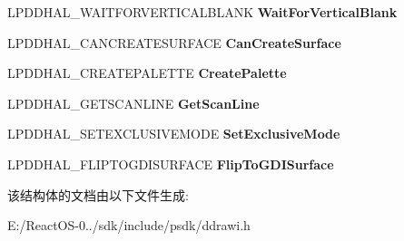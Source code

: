 \begin{DoxyCompactItemize}
L\+P\+D\+D\+H\+A\+L\+\_\+\+W\+A\+I\+T\+F\+O\+R\+V\+E\+R\+T\+I\+C\+A\+L\+B\+L\+A\+NK {\bfseries Wait\+For\+Vertical\+Blank}
\item 
\mbox{\label{struct___d_d_h_a_l___d_d_c_a_l_l_b_a_c_k_s_ae6a6874c5327c3bf841d5f1f0d74f0d4}} 
L\+P\+D\+D\+H\+A\+L\+\_\+\+C\+A\+N\+C\+R\+E\+A\+T\+E\+S\+U\+R\+F\+A\+CE {\bfseries Can\+Create\+Surface}
\item 
\mbox{\label{struct___d_d_h_a_l___d_d_c_a_l_l_b_a_c_k_s_a82879f935e596501893b5fc806541987}} 
L\+P\+D\+D\+H\+A\+L\+\_\+\+C\+R\+E\+A\+T\+E\+P\+A\+L\+E\+T\+TE {\bfseries Create\+Palette}
\item 
\mbox{\label{struct___d_d_h_a_l___d_d_c_a_l_l_b_a_c_k_s_a7786aa93923ee0b37fb30b10cedf978b}} 
L\+P\+D\+D\+H\+A\+L\+\_\+\+G\+E\+T\+S\+C\+A\+N\+L\+I\+NE {\bfseries Get\+Scan\+Line}
\item 
\mbox{\label{struct___d_d_h_a_l___d_d_c_a_l_l_b_a_c_k_s_ae48e29b0137c529c510c4957fe8df896}} 
L\+P\+D\+D\+H\+A\+L\+\_\+\+S\+E\+T\+E\+X\+C\+L\+U\+S\+I\+V\+E\+M\+O\+DE {\bfseries Set\+Exclusive\+Mode}
\item 
\mbox{\label{struct___d_d_h_a_l___d_d_c_a_l_l_b_a_c_k_s_a191a0f8dc4a00bfa41015ac88bd7f8ab}} 
L\+P\+D\+D\+H\+A\+L\+\_\+\+F\+L\+I\+P\+T\+O\+G\+D\+I\+S\+U\+R\+F\+A\+CE {\bfseries Flip\+To\+G\+D\+I\+Surface}
\end{DoxyCompactItemize}


该结构体的文档由以下文件生成\+:\begin{DoxyCompactItemize}
\item 
E\+:/\+React\+O\+S-\/0../sdk/include/psdk/ddrawi.\+h\end{DoxyCompactItemize}
